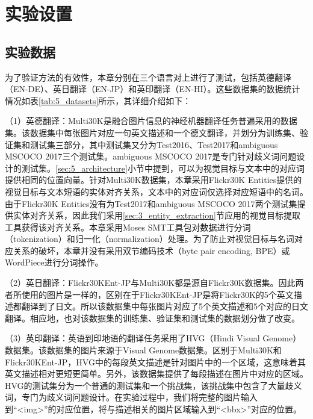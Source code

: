 \section{实验设置}
\label{sec:5_setup}

\subsection{实验数据}
\label{sec:5_datasets}

为了验证方法的有效性，本章分别在三个语言对上进行了测试，包括英德翻译（EN-DE）、英日翻译（EN-JP）和英印翻译（EN-HI）。这些数据集的数据统计情况如表\ref{tab:5_datasets}所示，其详细介绍如下：

（1）{\sffamily 英德翻译：}Multi30K是融合图片信息的神经机器翻译任务普遍采用的数据集。该数据集中每张图片对应一句英文描述和一个德文翻译，并划分为训练集、验证集和测试集三部分，其中测试集又分为Test2016、Test2017和ambiguous MSCOCO 2017三个测试集。ambiguous MSCOCO 2017是专门针对歧义词问题设计的测试集。\ref{sec:5_architecture}小节中提到，可以为视觉目标与文本中的对应词提供相同的位置向量。针对Multi30K数据集，本章采用Flickr30K Entities提供的视觉目标与文本短语的实体对齐关系，文本中的对应词仅选择对应短语中的名词。由于Flickr30K Entities没有为Test2017和ambiguous MSCOCO 2017两个测试集提供实体对齐关系，因此我们采用\ref{sec:3_entity_extraction}节应用的视觉目标提取工具获得该对齐关系。本章采用Moses SMT工具包对数据进行分词（tokenization）和归一化（normalization）处理。为了防止对视觉目标与名词对应关系的破坏，本章并没有采用双节编码技术（byte pair encoding, BPE）或WordPiece进行分词操作。

（2）{\sffamily 英日翻译：}Flickr30KEnt-JP与Multi30K都是源自Flickr30K数据集。因此两者所使用的图片是一样的，区别在于Flickr30KEnt-JP是将Flickr30K的5个英文描述都翻译到了日文。所以该数据集中每张图片对应了5个英文描述和5个对应的日文翻译。相应地，也对该数据集的训练集、验证集和测试集的数据划分做了改变。

（3）{\sffamily 英印翻译：}英语到印地语的翻译任务采用了HVG（Hindi Visual Genome）数据集。该数据集的图片来源于Visual Genome数据集。区别于Multi30K和Flickr30KEnt-JP，HVG中的每段英文描述是针对图片中的一个区域，这意味着其英文描述相对更短更简单。另外，该数据集提供了每段描述在图片中对应的区域。HVG的测试集分为一个普通的测试集和一个挑战集，该挑战集中包含了大量歧义词，专门为歧义词问题设计。在实验过程中，我们将完整的图片输入到“<img>”的对应位置，将与描述相关的图片区域输入到“<bbx>”对应的位置。

